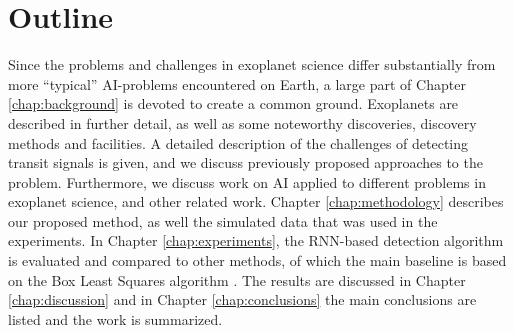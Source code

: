 
\section{Outline}

Since the problems and challenges in exoplanet science differ substantially from more ``typical'' AI-problems encountered on Earth, a large part of Chapter \ref{chap:background} is devoted to create a common ground. Exoplanets are described in further detail, as well as some noteworthy discoveries, discovery methods and facilities. A detailed description of the challenges of detecting transit signals is given, and we discuss previously proposed approaches to the problem. Furthermore, we discuss work on AI applied to different problems in exoplanet science, and other related work. Chapter \ref{chap:methodology} describes our proposed method, as well the simulated data that was used in the experiments. In Chapter \ref{chap:experiments}, the RNN-based detection algorithm is evaluated and compared to other methods, of which the main baseline is based on the Box Least Squares algorithm \cite{kovacs2002box}. The results are discussed in Chapter \ref{chap:discussion} and in Chapter \ref{chap:conclusions} the main conclusions are listed and the work is summarized.
